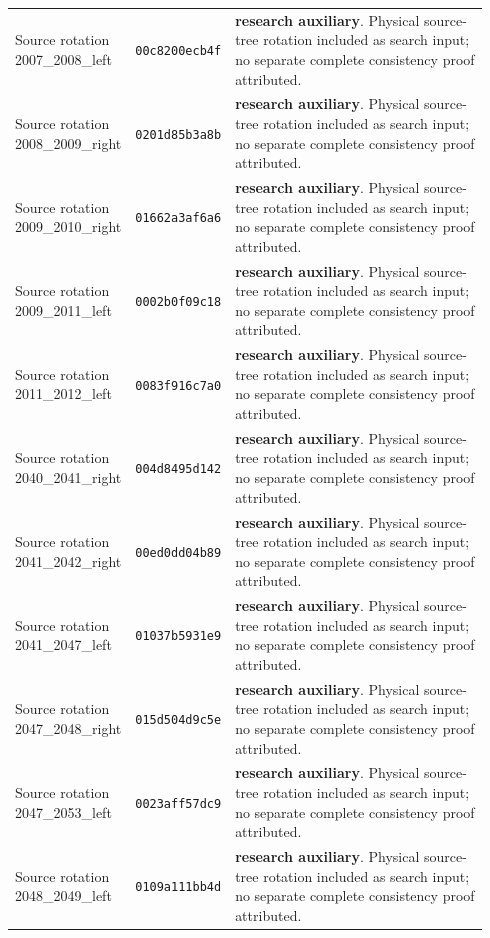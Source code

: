 {\begin{longtable}{@{}>{\raggedright\arraybackslash}p{0.23\linewidth}>{\raggedright\arraybackslash}p{0.145\linewidth}>{\raggedright\arraybackslash}p{0.56\linewidth}@{}}
Source rotation 2007\_2008\_left & \texttt{00c8200ecb4f} & \textbf{research auxiliary}. Physical source-tree rotation included as search input; no separate complete consistency proof attributed.\\[4pt]
Source rotation 2008\_2009\_right & \texttt{0201d85b3a8b} & \textbf{research auxiliary}. Physical source-tree rotation included as search input; no separate complete consistency proof attributed.\\[4pt]
Source rotation 2009\_2010\_right & \texttt{01662a3af6a6} & \textbf{research auxiliary}. Physical source-tree rotation included as search input; no separate complete consistency proof attributed.\\[4pt]
Source rotation 2009\_2011\_left & \texttt{0002b0f09c18} & \textbf{research auxiliary}. Physical source-tree rotation included as search input; no separate complete consistency proof attributed.\\[4pt]
Source rotation 2011\_2012\_left & \texttt{0083f916c7a0} & \textbf{research auxiliary}. Physical source-tree rotation included as search input; no separate complete consistency proof attributed.\\[4pt]
Source rotation 2040\_2041\_right & \texttt{004d8495d142} & \textbf{research auxiliary}. Physical source-tree rotation included as search input; no separate complete consistency proof attributed.\\[4pt]
Source rotation 2041\_2042\_right & \texttt{00ed0dd04b89} & \textbf{research auxiliary}. Physical source-tree rotation included as search input; no separate complete consistency proof attributed.\\[4pt]
Source rotation 2041\_2047\_left & \texttt{01037b5931e9} & \textbf{research auxiliary}. Physical source-tree rotation included as search input; no separate complete consistency proof attributed.\\[4pt]
Source rotation 2047\_2048\_right & \texttt{015d504d9c5e} & \textbf{research auxiliary}. Physical source-tree rotation included as search input; no separate complete consistency proof attributed.\\[4pt]
Source rotation 2047\_2053\_left & \texttt{0023aff57dc9} & \textbf{research auxiliary}. Physical source-tree rotation included as search input; no separate complete consistency proof attributed.\\[4pt]
Source rotation 2048\_2049\_left & \texttt{0109a111bb4d} & \textbf{research auxiliary}. Physical source-tree rotation included as search input; no separate complete consistency proof attributed.\\[4pt]

\end{longtable}}
